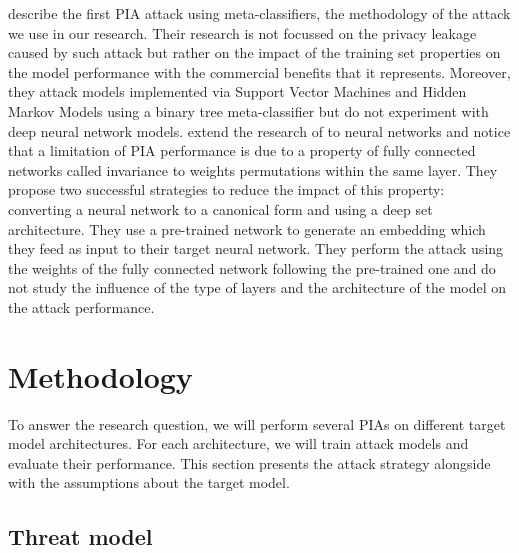 \documentclass[11pt]{article}
\begin{document}
\citet{Ateniese2015} describe the first PIA attack using meta-classifiers, the methodology of the attack we use in our research. Their research is not focussed on the privacy leakage caused by such attack but rather on the impact of the training set properties on the model performance with the commercial benefits that it represents. Moreover, they attack models implemented via Support Vector Machines and Hidden Markov Models using a binary tree meta-classifier but do not experiment with deep neural network models. \citet{Ganju2018} extend the research of \citet{Ateniese2015} to neural networks and notice that a limitation of PIA performance is due to a property of fully connected networks called invariance to weights permutations within the same layer. They propose two successful strategies to reduce the impact of this property: converting a neural network to a canonical form and using a deep set architecture. They use a pre-trained network to generate an embedding which they feed as input to their target neural network. They perform the attack using the weights of the fully connected network following the pre-trained one and do not study the influence of the type of layers and the architecture of the model on the attack performance.\\

\section{Methodology}
To answer the research question, we will perform several PIAs on different target model architectures. For each architecture, we will train attack models and evaluate their performance. This section presents the attack strategy alongside with the assumptions about the target model. \\

\subsection{Threat model}
\end{document}
